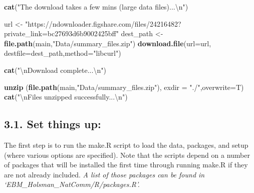 \documentclass[]{article}
\newenvironment{Shaded}{\begin{snugshade}}{\end{snugshade}}
\newcommand{\KeywordTok}[1]{\textcolor[rgb]{0.13,0.29,0.53}{\textbf{{#1}}}}
\newcommand{\DataTypeTok}[1]{\textcolor[rgb]{0.13,0.29,0.53}{{#1}}}
\newcommand{\CharTok}[1]{\textcolor[rgb]{0.31,0.60,0.02}{{#1}}}
\newcommand{\StringTok}[1]{\textcolor[rgb]{0.31,0.60,0.02}{{#1}}}
\newcommand{\NormalTok}[1]{{#1}}
\begin{document}
\begin{Shaded}
\begin{Highlighting}[]
    \KeywordTok{cat}\NormalTok{(}\StringTok{"The download takes a few mins (large data files)...}\CharTok{\textbackslash{}n}\StringTok{"}\NormalTok{)}

    \NormalTok{url       <-}\StringTok{ "https://ndownloader.figshare.com/files/24216482?private_link=bc27693d6b9002425bff"}
    \NormalTok{dest_path  <-}\StringTok{  }\KeywordTok{file.path}\NormalTok{(main,}\StringTok{"Data/summary_files.zip"}\NormalTok{)}
    \KeywordTok{download.file}\NormalTok{(}\DataTypeTok{url=}\NormalTok{url, }\DataTypeTok{destfile=}\NormalTok{dest_path,}\DataTypeTok{method=}\StringTok{"libcurl"}\NormalTok{)}
    
    \KeywordTok{cat}\NormalTok{(}\StringTok{"}\CharTok{\textbackslash{}n}\StringTok{Download complete...}\CharTok{\textbackslash{}n}\StringTok{"}\NormalTok{)}
    
    \KeywordTok{unzip} \NormalTok{(}\KeywordTok{file.path}\NormalTok{(main,}\StringTok{"Data/summary_files.zip"}\NormalTok{), }\DataTypeTok{exdir =} \StringTok{"./"}\NormalTok{,}\DataTypeTok{overwrite=}\NormalTok{T)}
    \KeywordTok{cat}\NormalTok{(}\StringTok{"}\CharTok{\textbackslash{}n}\StringTok{Files unzipped successfully...}\CharTok{\textbackslash{}n}\StringTok{"}\NormalTok{)}
\end{Highlighting}
\end{Shaded}

\subsection{3.1. Set things up:}\label{set-things-up}

The first step is to run the make.R script to load the data, packages,
and setup (where various options are specified). Note that the scripts
depend on a number of packages that will be installed the first time
through running make.R if they are not already included. \emph{A list of
those packages can be found in `EBM\_Holsman\_NatComm/R/packages.R'.}
\end{document}
